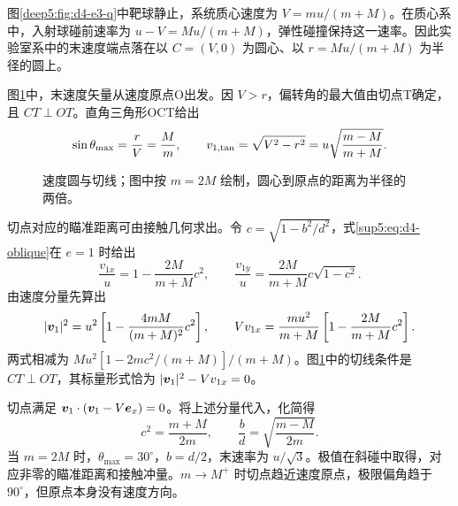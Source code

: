 \begin{solution}
图\ref{deep5:fig:d4-e3-q}中靶球静止，系统质心速度为 $V=mu/(m+M)$。在质心系中，入射球碰前速率为 $u-V=Mu/(m+M)$，弹性碰撞保持这一速率。因此实验室系中的末速度端点落在以 $C=(V,0)$ 为圆心、以 $r=Mu/(m+M)$ 为半径的圆上。

图\ref{deep5:fig:d4-e3-s}中，末速度矢量从速度原点O出发。因 $V>r$，偏转角的最大值由切点T确定，且 $CT\perp OT$。直角三角形OCT给出
\begin{equation}
 \sin\theta_{\max}=\frac rV=\frac Mm,\qquad
 v_{1,\rm tan}=\sqrt{V^2-r^2}
 =u\sqrt{\frac{m-M}{m+M}}.
\end{equation}
\begin{figure}[H]\centering
{}
\caption{速度圆与切线；图中按 $m=2M$ 绘制，圆心到原点的距离为半径的两倍。}\label{deep5:fig:d4-e3-s}
\end{figure}
切点对应的瞄准距离可由接触几何求出。令 $c=\sqrt{1-b^2/d^2}$，式\eqref{sup5:eq:d4-oblique}在 $e=1$ 时给出
\begin{equation}
 \frac{v_{1x}}u=1-\frac{2M}{m+M}c^2,\qquad
 \frac{v_{1y}}u=\frac{2M}{m+M}c\sqrt{1-c^2}.
\end{equation}
由速度分量先算出
\[
|\bm{v}_1|^2=u^2\left[1-\frac{4mM}{(m+M)^2}c^2\right],
\qquad
Vv_{1x}=\frac{mu^2}{m+M}\left[1-\frac{2M}{m+M}c^2\right].
\]
两式相减为 $Mu^2[1-2mc^2/(m+M)]/(m+M)$。图\ref{deep5:fig:d4-e3-s}中的切线条件是 $CT\perp OT$，其标量形式恰为 $|\bm{v}_1|^2-Vv_{1x}=0$。

切点满足 $\bm{v}_1\cdot(\bm{v}_1-V\bm{e}_x)=0$。将上述分量代入，化简得
\begin{equation}
 c^2=\frac{m+M}{2m},\qquad
 \frac b d=\sqrt{\frac{m-M}{2m}}.
\end{equation}
当 $m=2M$ 时，$\theta_{\max}=30^\circ$，$b=d/2$，末速率为 $u/\sqrt3$。极值在斜碰中取得，对应非零的瞄准距离和接触冲量。$m\to M^+$ 时切点趋近速度原点，极限偏角趋于 $90^\circ$，但原点本身没有速度方向。
\end{solution}



